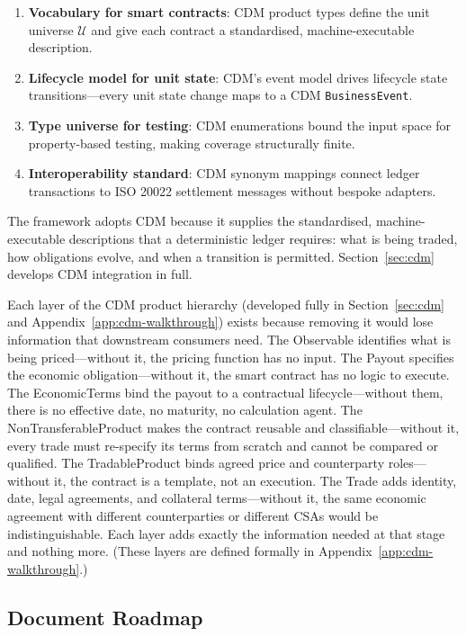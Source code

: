 \documentclass[11pt,a4paper]{article}
\begin{document}
\begin{enumerate}[nosep]
\item \textbf{Vocabulary for smart contracts}: CDM product types define the unit universe $\mathcal{U}$ and give each contract a standardised, machine-executable description.
\item \textbf{Lifecycle model for unit state}: CDM's event model drives lifecycle state transitions---every unit state change maps to a CDM \texttt{BusinessEvent}.
\item \textbf{Type universe for testing}: CDM enumerations bound the input space for property-based testing, making coverage structurally finite.
\item \textbf{Interoperability standard}: CDM synonym mappings connect ledger transactions to ISO 20022 settlement messages without bespoke adapters.
\end{enumerate}

\noindent The framework adopts CDM because it supplies the standardised, machine-executable descriptions that a deterministic ledger requires: what is being traded, how obligations evolve, and when a transition is permitted. Section~\ref{sec:cdm} develops CDM integration in full.

Each layer of the CDM product hierarchy (developed fully in Section~\ref{sec:cdm} and Appendix~\ref{app:cdm-walkthrough}) exists because removing it would lose information that downstream consumers need. The Observable identifies what is being priced---without it, the pricing function has no input. The Payout specifies the economic obligation---without it, the smart contract has no logic to execute. The EconomicTerms bind the payout to a contractual lifecycle---without them, there is no effective date, no maturity, no calculation agent. The NonTransferableProduct makes the contract reusable and classifiable---without it, every trade must re-specify its terms from scratch and cannot be compared or qualified. The TradableProduct binds agreed price and counterparty roles---without it, the contract is a template, not an execution. The Trade adds identity, date, legal agreements, and collateral terms---without it, the same economic agreement with different counterparties or different CSAs would be indistinguishable. Each layer adds exactly the information needed at that stage and nothing more. (These layers are defined formally in Appendix~\ref{app:cdm-walkthrough}.)

\subsection{Document Roadmap}
\end{document}
